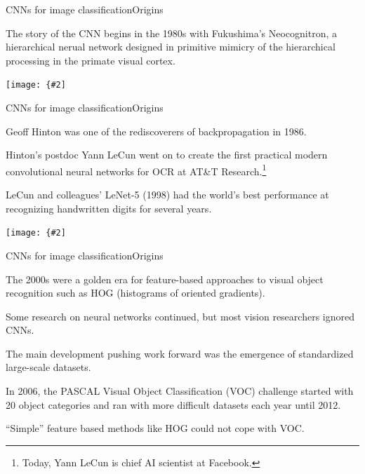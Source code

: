\documentclass{beamer}
\newcommand{\myfig}[3]{\centerline{\texttt{[image: \{\#2]}}}
\begin{document}
\begin{frame}{CNNs for image classification}{Origins}

  The story of the CNN begins in the 1980s with Fukushima's
  \alert{Neocognitron}, a hierarchical nerual network designed in
  primitive mimicry of the hierarchical processing in the primate
  visual cortex.

  \medskip

  \myfig{3.5in}{fukushima-fig2}{Fukushima (1980), Fig.\ 2}

\end{frame}


\begin{frame}{CNNs for image classification}{Origins}

  Geoff Hinton was one of the rediscoverers of backpropagation in 1986.

  \medskip

  Hinton's postdoc Yann LeCun went on to create the first practical
  modern convolutional neural networks for OCR at AT\&T
  Research.\footnote{Today, Yann LeCun is chief AI scientist at
    Facebook.}

  \medskip

  LeCun and colleagues' LeNet-5 (1998) had the world's best
  performance at recognizing handwritten digits for several years.

  \medskip

  \myfig{4in}{lecun-fig2}{LeCun et al.\ (1998), Fig.\ 2}

\end{frame}


\begin{frame}{CNNs for image classification}{Origins}

  The 2000s were a golden era for feature-based approaches to visual
  object recognition such as HOG (histograms of oriented gradients).

  \medskip

  Some research on neural networks continued, but most vision
  researchers ignored CNNs.

  \medskip

  The main development pushing work forward was the emergence of
  \alert{standardized large-scale datasets}.

  \medskip

  In 2006, the PASCAL Visual Object Classification (VOC) challenge
  started with 20 object categories and ran with more difficult
  datasets each year until 2012.

  \medskip

  ``Simple'' feature based methods like HOG could not cope with VOC.

\end{frame}
\end{document}
